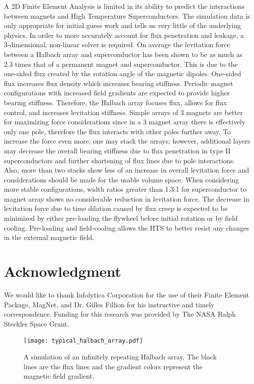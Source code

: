 A 2D Finite Element Analysis is limited in its ability to predict the interactions between magnets and High Temperature Superconductors.  The simulation data is only appropriate for initial guess work and tells us very little of the underlying physics.  In order to more accurately account for flux penetration and leakage, a 3-dimensional, non-linear solver is required.  On average the levitation force between a Halbach array and superconductor has been shown to be as much as 2.3 times that of a permanent magnet and superconductor\cite{Jing}.  This is due to the one-sided flux created by the rotation angle of the magnetic dipoles.  One-sided flux increases flux density which increases bearing stiffness.  Periodic magnet configurations with increased field gradients are expected to provide higher bearing stiffness.  Therefore, the Halbach array focuses flux, allows for flux control, and increases levitation stiffness.  Simple arrays of 3 magnets are better for maximizing force considerations since in a 3 magnet array there is effectively only one pole, therefore the flux interacts with other poles further away.  To increase the force even more, one may stack the arrays; however, additional layers may decrease the overall bearing stiffness due to flux penetration in type II superconductors and further shortening of flux lines due to pole interactions.  Also, more than two stacks show less of an increase in overall levitation force and considerations should be made for the usable volume space. When considering more stable configurations, width ratios greater than 1.3:1 for superconductor to magnet array shows no considerable reduction in levitation force. The decrease in levitation force due to time dilation caused by flux creep is expected to be minimized by either pre-loading the flywheel before initial rotation or by field cooling.  Pre-loading and field-cooling allows the HTS to better resist any changes in the external magnetic field.


\section*{Acknowledgment}
We would like to thank Infolytica Corporation for the use of their Finite Element Package, MagNet, and Dr. Gilles Fillion for his instructive and timely correspondence.  Funding for this research was provided by The NASA Ralph Steckler Space Grant.

\pagebreak 

\begin{figure}[htbp]
\centering
\texttt{[image: typical\_halbach\_array.pdf]}
\caption{A simulation of an infinitely repeating Halbach array.  The black lines are the flux lines and the gradient colors represent the magnetic field gradient.}
\label{fig_halbach}
\end{figure}

